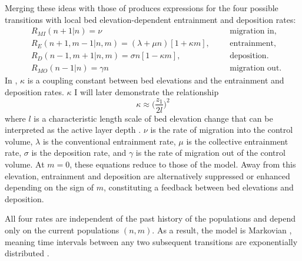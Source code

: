 Merging these ideas with those of \citet{Ancey2008} produces expressions for the four possible transitions with local bed elevation-dependent entrainment and deposition rates:
\begin{align}
	&R_{MI}(n+1|n) = \nu && &\text{migration in}, \label{eq:rate1}\\
	&R_E(n+1,m-1|n,m)=(\lambda + \mu n)[1 + \kappa m], && &\text{entrainment}, \label{eq:rate2}\\
	&R_D(n-1,m+1|n,m)=\sigma n [1- \kappa m ], && &\text{deposition}. \label{eq:rate3} \\
	&R_{MO}(n-1|n) =\gamma n && &\text{migration out} \label{eq:rate4}.
\end{align}
In \DIFdelbegin {}\DIFdelend \DIFaddbegin {}\DIFaddend , $\kappa$ is a coupling constant between bed elevations and the entrainment and deposition rates.
\DIFaddbegin {}\DIFaddend $\kappa$ \DIFdelbegin {}\DIFdelend I will later demonstrate the relationship
\begin{equation}\kappa \approx \big(\frac{z_1}{2l}\big)^2 \label{eq:active}
\end{equation}
where $l$ is a characteristic length scale of bed elevation change that can be interpreted as the active layer depth \citep{Wong2007,Church2017}.
\DIFaddbegin {}\DIFaddend $\nu$ is the rate of migration into the control volume, $\lambda$ is the conventional entrainment rate, $\mu$ is the collective entrainment rate, $\sigma$ is the deposition rate, and $\gamma$ is the rate of migration out of the control volume.
At $m=0$, these equations reduce to those of the \citet{Ancey2008} model.
Away from this elevation, entrainment and deposition are alternatively suppressed or enhanced depending on the sign of $m$, constituting a feedback between bed elevations and \DIFdelbegin {}\DIFdelend \DIFaddbegin {}\DIFaddend deposition.

All four rates are independent of the past history of the populations and depend only on the current populations $(n,m)$. 
As a result, the model is Markovian \citep{Cox1965, VanKampen2007}, meaning time intervals between any two subsequent transitions are exponentially distributed \citep{Gillespie2007}.

